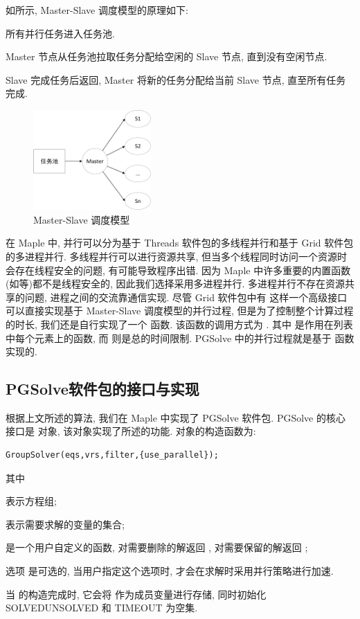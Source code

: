 如所示, Master-Slave 调度模型的原理如下:
\begin{compactenum}[Step 1.]
\item 所有并行任务进入任务池.
\item Master 节点从任务池拉取任务分配给空闲的 Slave 节点, 直到没有空闲节点.
\item Slave 完成任务后返回, Master 将新的任务分配给当前 Slave 节点, 直至所有任务完成. 
\end{compactenum}

\begin{figure}[htbp]
\centering 
\includegraphics[width=0.4\textwidth]{fig/msp.pdf}
\caption{Master-Slave 调度模型}\label{msp}
\end{figure}

在 Maple 中, 并行可以分为基于 Threads 软件包的多线程并行和基于 Grid 软件包的多进程并行. 多线程并行可以进行资源共享, 但当多个线程同时访问一个资源时会存在线程安全的问题, 有可能导致程序出错. 因为 Maple 中许多重要的内置函数(如等)都不是线程安全的, 因此我们选择采用多进程并行. 多进程并行不存在资源共享的问题, 进程之间的交流靠通信实现. 尽管 Grid 软件包中有  这样一个高级接口可以直接实现基于 Master-Slave 调度模型的并行过程, 但是为了控制整个计算过程的时长, 我们还是自行实现了一个  函数. 该函数的调用方式为 . 其中  是作用在列表  中每个元素上的函数, 而  则是总的时间限制. PGSolve 中的并行过程就是基于  函数实现的. 

\subsection{PGSolve软件包的接口与实现}
根据上文所述的算法, 我们在 Maple 中实现了 PGSolve 软件包. PGSolve 的核心接口是  对象, 该对象实现了所述的功能. 对象的构造函数为: 
\begin{verbatim}
GroupSolver(eqs,vrs,filter,{use_parallel});
\end{verbatim}
其中 
\begin{compactitem}[\textbullet]
\item {} 表示方程组;
\item {} 表示需要求解的变量的集合;
\item {} 是一个用户自定义的函数, 对需要删除的解返回 , 对需要保留的解返回 ;
\item 选项  是可选的, 当用户指定这个选项时,  才会在求解时采用并行策略进行加速.
\end{compactitem}
当  的构造完成时, 它会将  作为成员变量进行存储, 同时初始化 SOLVED\D UNSOLVED 和 TIMEOUT 为空集. 

